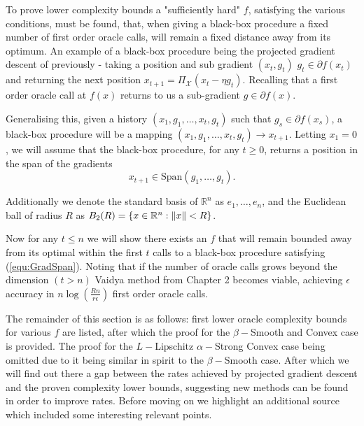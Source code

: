 To prove lower complexity bounds a "sufficiently hard" $f$, satisfying the various conditions, must be found, that, when giving a black-box procedure a fixed number of first order oracle calls, will remain a fixed distance away from its optimum. An example of a black-box procedure being the projected gradient descent of previously - taking a position and sub gradient $(x_t,g_t)$ $g_t \in \partial f(x_t)$ and returning the next position $x_{t+1} = \Pi_{\mathcal{X}}(x_t - \eta g_t)$. Recalling that a first order oracle call at $f(x)$ returns to us a sub-gradient $g \in \partial f(x)$.

Generalising this, given a history $(x_1,g_1,\dots,x_t,g_t)$ such that $g_s \in \partial f(x_s)$, a black-box procedure will be a mapping $(x_1,g_1,\dots,x_t,g_t) \rightarrow x_{t+1}$. Letting $x_1 = 0$, we will assume that the black-box procedure, for any $t \geq 0$, returns a position in the span of the gradients
\begin{equation}
x_{t+1} \in \text{Span}(g_1,\dots,g_t).
\label{equ:GradSpan}
\end{equation}

Additionally we denote the standard basis of $\mathbb{R}^n$ as $e_1,\dots,e_n$, and the Euclidean ball of radius $R$ as $B_2(R) = \{x \in \mathbb{R}^n : \left\lVert x\right\rVert<R\}$.

Now for any $t \leq n$ we will show there exists an $f$ that will remain bounded away from its optimal within the first $t$ calls to a black-box procedure satisfying (\ref{equ:GradSpan}). Noting that if the number of oracle calls grows beyond the dimension $(t > n)$ Vaidya method from Chapter 2 becomes viable, achieving $\epsilon$ accuracy in $n\log(\frac{Rn}{r \epsilon})$ first order oracle calls.

The remainder of this section is as follows: first lower oracle complexity bounds for various $f$ are listed, after which the proof for the $\beta-$Smooth and Convex case is provided. The proof for the $L-$Lipschitz $\alpha-$Strong Convex case being omitted due to it being similar in spirit to the $\beta-$Smooth case. After which we will find out there a gap between the rates achieved by projected gradient descent and the proven complexity lower bounds, suggesting new methods can be found in order to improve rates. Before moving on we highlight an additional source \cite[75-76]{bach} which included some interesting relevant points.

